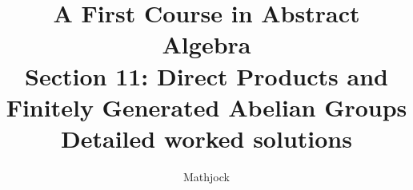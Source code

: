 
\title{\textbf{A First Course in Abstract Algebra}\\[0.3em]Section 11: Direct Products and Finitely Generated Abelian Groups\\[0.3em]\large Detailed worked solutions}
\author{Mathjock}
\date{}

\maketitle
\bookinfo
\tableofcontents
\clearpage
\renewcommand{\thesection}{11}
\renewcommand{\theHsection}{fraleigh.11}


